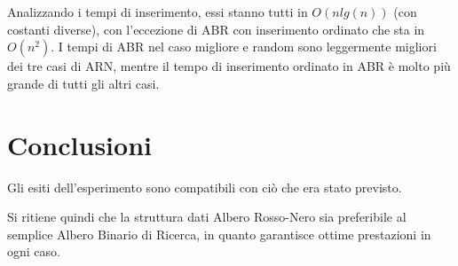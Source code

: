 \documentclass[]{article}
\begin{document}
Analizzando i tempi di inserimento, essi stanno tutti in $O(n lg(n))$ (con costanti diverse), con l'eccezione di ABR con inserimento ordinato che sta in $O(n^2)$.
I tempi di ABR nel caso migliore e random sono leggermente migliori dei tre casi di ARN, mentre il tempo di inserimento ordinato in ABR è molto più grande di tutti gli altri casi.

\section{Conclusioni}
Gli esiti dell'esperimento sono compatibili con ciò che era stato previsto.

Si ritiene quindi che la struttura dati Albero Rosso-Nero sia preferibile al semplice Albero Binario di Ricerca, in quanto garantisce ottime prestazioni in ogni caso.
\end{document}
